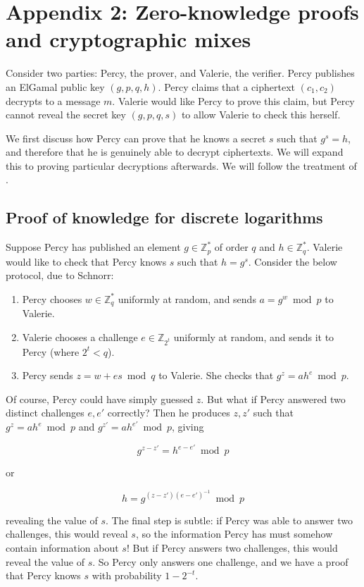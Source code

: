\documentclass[11pt,twoside,a4paper]{article}
\theoremstyle{definition}
\begin{document}
\section{Appendix 2: Zero-knowledge proofs and cryptographic mixes}\label{app-proof}
Consider two parties: Percy, the prover, and Valerie, the verifier. Percy publishes an ElGamal public key \((g,p,q,h)\). Percy claims that a ciphertext \((c_1, c_2)\) decrypts to a message \(m\). Valerie would like Percy to prove this claim, but Percy cannot reveal the secret key \((g,p,q,s)\) to allow Valerie to check this herself.

We first discuss how Percy can prove that he knows a secret \(s\) such that \(g^s=h\), and therefore that he is genuinely able to decrypt ciphertexts. We will expand this to proving particular decryptions afterwards. We will follow the treatment of \cite{damgaard2002sigma}.
\subsection{Proof of knowledge for discrete logarithms}
Suppose Percy has published an element \(g\in\mathbb{Z}^*_p\) of order \(q\) and \(h\in\mathbb{Z}^*_q\). Valerie would like to check that Percy knows \(s\) such that \(h=g^s\). Consider the below protocol, due to Schnorr:
\begin{enumerate}
    \item Percy chooses \(w\in\mathbb{Z}^*_q\) uniformly at random, and sends \(a=g^w\bmod p\) to Valerie.
    \item Valerie chooses a challenge \(e\in\mathbb{Z}_{2^t}\) uniformly at random, and sends it to Percy (where \(2^t<q\)).
    \item Percy sends \(z=w+es\bmod q\) to Valerie. She checks that \(g^z=ah^e\bmod p\).
\end{enumerate}
Of course, Percy could have simply guessed \(z\). But what if Percy answered two distinct challenges \(e,e'\) correctly? Then he produces \(z,z'\) such that \(g^z=ah^e\bmod p\) and \(g^{z'}=ah^{e'}\bmod p\), giving

\[g^{z-z'}=h^{e-e'}\bmod p\]

or

\[h=g^{(z-z')(e-e')^{-1}}\bmod p\]

revealing the value of \(s\). The final step is subtle: if Percy was able to answer two challenges, this would reveal \(s\), so the information Percy has must somehow contain information about \(s\)! But if Percy answers two challenges, this would reveal the value of \(s\). So Percy only answers one challenge, and we have a proof that Percy knows \(s\) with  probability \(1-2^{-t}\).
\end{document}
